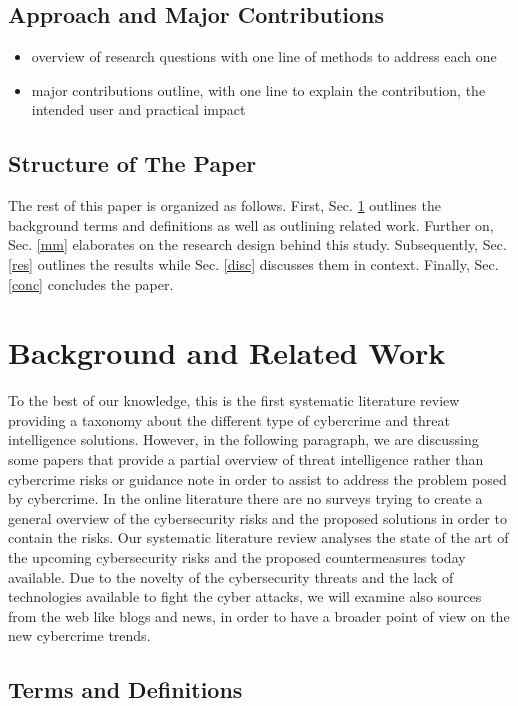 \subsection{Approach and Major Contributions}
\begin{itemize}
    \item overview of research questions with one line of methods to address each one
    \item major contributions outline, with one line to explain the contribution, the intended user and practical impact
\end{itemize}

\subsection{Structure of The Paper}

The rest of this paper is organized as follows. First, Sec. \ref{rel} outlines the background terms and definitions as well as outlining related work. Further on, Sec. \ref{mm} elaborates on the research design behind this study. Subsequently, Sec. \ref{res} outlines the results while Sec. \ref{disc} discusses them in context. Finally, Sec. \ref{conc} concludes the paper.

\section{Background and Related Work}\label{rel}
To the best of our knowledge, this is the first systematic literature review providing a taxonomy about the different type of cybercrime and threat intelligence solutions. However, in the following paragraph, we are discussing some papers that provide a partial overview of threat intelligence rather than cybercrime risks or guidance note in order to assist to address the problem posed by cybercrime. In the online literature there are no surveys trying to create a general overview of the cybersecurity risks and the proposed solutions in order to contain the risks. Our systematic literature review analyses the state of the art of the upcoming cybersecurity risks and the proposed countermeasures today available.
Due to the novelty of the cybersecurity threats and the lack of technologies available to fight the cyber attacks, we will examine also sources from the web like blogs and news, in order to have a broader point of view on the new cybercrime trends.


\subsection{Terms and Definitions}


